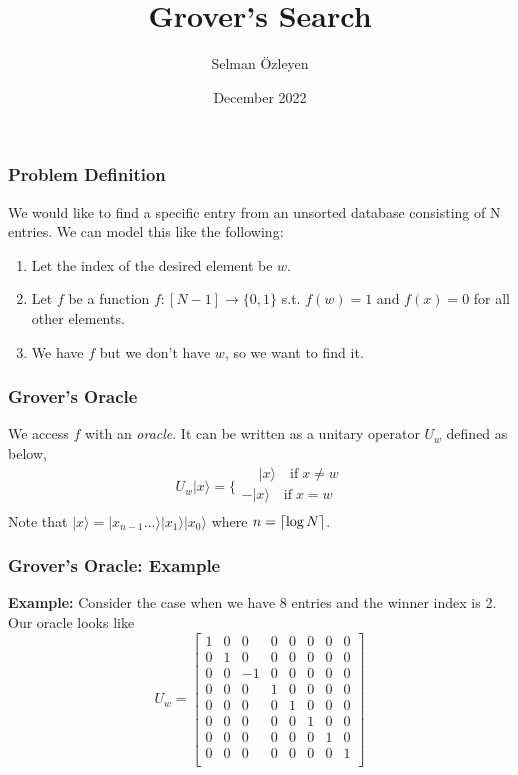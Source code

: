 \documentclass{beamer}
\title{Grover's Search }
\author{Selman \"Ozleyen}
\institute{Technische Universit\"at M\"unchen\\
School of Computation, Information and Technology\\}
\date{December 2022}
\DeclarePairedDelimiter{\ceil}{\lceil}{\rceil}
\begin{document}
\frame{\titlepage}



\begin{frame}
  \frametitle{Problem Definition}
  We would like to find a specific entry from an unsorted
  database consisting of N entries. We can model this like the following:
  \begin{enumerate}
    \item Let the index of the desired element be $w$.
    \item Let $f$ be a function 
    $f:[N-1]\rightarrow\{0,1\}$ s.t. $f(w)=1$ and $f(x)=0$ for all other elements.
    \item We have $f$ but we don't have $w$, so we want to find it.
  \end{enumerate}
\end{frame}




\begin{frame}
  \frametitle{Grover's Oracle}
  We access $f$ with an \textit{oracle}. It can be written
  as a unitary operator $U_w$ defined as below,
  $$
  U_w|x\rangle = \bigg\{
    \begin{aligned}
    \phantom{-}|x\rangle \quad \text{if} \; x \neq w \\
    -|x\rangle \quad \text{if} \; x = w \\
    \end{aligned}
    $$
  Note that $|x\rangle = |x_{n-1}...\rangle|x_1\rangle |x_0\rangle$ where $n=\ceil{\log N}$.
\end{frame}

\begin{frame}
  \frametitle{Grover's Oracle: Example}
  \textbf{Example:}
  Consider the case when we have 8 entries and the winner index is 2. Our oracle looks like
  $$
  U_w = 
\begin{bmatrix}
1 & 0 & 0 & 0 & 0 & 0 & 0 & 0 \\
0 & 1 & 0 & 0 & 0 & 0 & 0 & 0 \\
0 & 0 & -1 & 0 & 0 & 0 & 0 & 0 \\
0 & 0 & 0 & 1 & 0 & 0 & 0 & 0 \\
0 & 0 & 0 & 0 & 1 & 0 & 0 & 0 \\
0 & 0 & 0 & 0 & 0 & 1 & 0 & 0 \\
0 & 0 & 0 & 0 & 0 & 0 & 1 & 0 \\
0 & 0 & 0 & 0 & 0 & 0 & 0 & 1 \\
\end{bmatrix}
  $$
\end{frame}
\end{document}
